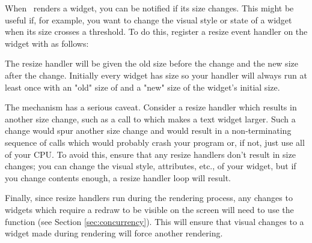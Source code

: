 When \vtyui\ renders a widget, you can be notified if its size changes.  This
might be useful if, for example, you want to change the visual style or state
of a widget when its size crosses a threshold.  To do this, register a resize
event handler on the widget with  as follows:


The resize handler will be given the old size before the change and the new
size after the change.  Initially every widget has size  so your
handler will always run at least once with an "old" size of  and a
"new" size of the widget's initial size.

The  mechanism has a serious caveat.  Consider a resize handler
which results in another size change, such as a call to  which
makes a text widget larger.  Such a change would spur another size change and
would result in a non-terminating sequence of calls which would probably crash
your program or, if not, just use all of your CPU.  To avoid this, ensure that
any resize handlers don't result in size changes; you can change the visual
style, attributes, etc., of your widget, but if you change contents enough, a
resize handler loop will result.

Finally, since resize handlers run during the rendering process, any changes to
widgets which require a redraw to be visible on the screen will need to use the
 function (see Section \ref{sec:concurrency}).  This will ensure
that visual changes to a widget made during rendering will force another
rendering.
